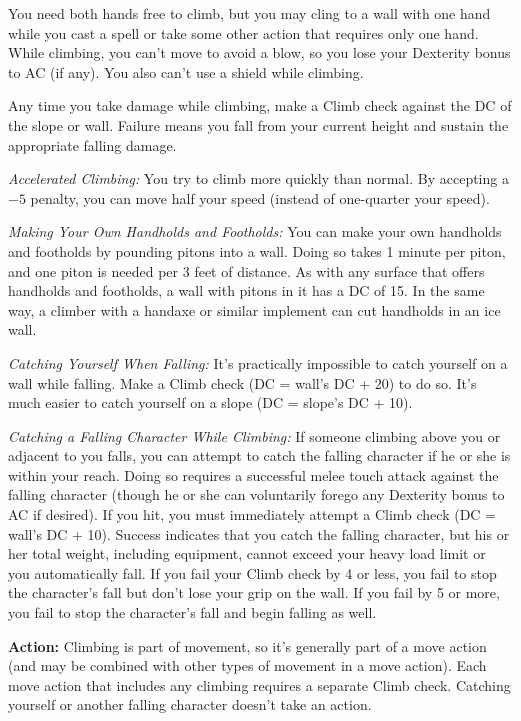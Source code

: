 You need both hands free to climb, but you may cling to a wall with one hand while you cast a spell or take some other action that requires only one hand. While climbing, you can't move to avoid a blow, so you lose your Dexterity bonus to AC (if any). You also can't use a shield while climbing.

Any time you take damage while climbing, make a Climb check against the DC of the slope or wall. Failure means you fall from your current height and sustain the appropriate falling damage.

\textit{Accelerated Climbing:} You try to climb more quickly than normal. By accepting a $-5$ penalty, you can move half your speed (instead of one-quarter your speed).

\textit{Making Your Own Handholds and Footholds:} You can make your own handholds and footholds by pounding pitons into a wall. Doing so takes 1 minute per piton, and one piton is needed per 3 feet of distance. As with any surface that offers handholds and footholds, a wall with pitons in it has a DC of 15. In the same way, a climber with a handaxe or similar implement can cut handholds in an ice wall.

\textit{Catching Yourself When Falling:} It's practically impossible to catch yourself on a wall while falling. Make a Climb check (DC = wall's DC + 20) to do so. It's much easier to catch yourself on a slope (DC = slope's DC + 10).

\textit{Catching a Falling Character While Climbing:} If someone climbing above you or adjacent to you falls, you can attempt to catch the falling character if he or she is within your reach. Doing so requires a successful melee touch attack against the falling character (though he or she can voluntarily forego any Dexterity bonus to AC if desired). If you hit, you must immediately attempt a Climb check (DC = wall's DC + 10). Success indicates that you catch the falling character, but his or her total weight, including equipment, cannot exceed your heavy load limit or you automatically fall. If you fail your Climb check by 4 or less, you fail to stop the character's fall but don't lose your grip on the wall. If you fail by 5 or more, you fail to stop the character's fall and begin falling as well.

\textbf{Action:} Climbing is part of movement, so it's generally part of a move action (and may be combined with other types of movement in a move action). Each move action that includes any climbing requires a separate Climb check. Catching yourself or another falling character doesn't take an action.

